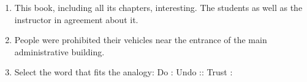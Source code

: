 \documentclass[journal,12pt,onecolumn]{IEEEtran}
\theoremstyle{remark}
\begin{document}
\begin{enumerate}[start=1, label=Q.\arabic*]

\item This book, including all its chapters, \underline{\hspace{2cm}} interesting. The students as well as the instructor \underline{\hspace{2cm}} in agreement about it.
    \begin{enumerate}
    \end{enumerate}

\hfill{}

\item People were prohibited \underline{\hspace{2cm}} their vehicles near the entrance of the main administrative building.
    \begin{enumerate}
    \end{enumerate}

\hfill{}

\item Select the word that fits the analogy:
Do : Undo :: Trust : \underline{\hspace{2cm}}
    \begin{enumerate}
    \end{enumerate}


\end{enumerate}
\end{document}
